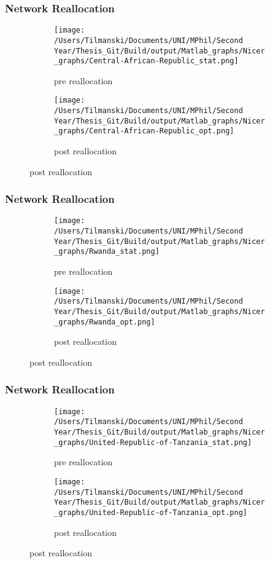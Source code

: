 \documentclass[]{beamer}   	%
\begin{document}
\begin{frame}
  \frametitle{Network Reallocation}
\begin{figure}
\begin{subfigure}[c]{0.48\textwidth}
\texttt{[image: /Users/Tilmanski/Documents/UNI/MPhil/Second Year/Thesis\_Git/Build/output/Matlab\_graphs/Nicer\_graphs/Central-African-Republic\_stat.png]}
\caption{pre reallocation}
\label{fig:cae_pre}
\end{subfigure}
\begin{subfigure}[c]{0.48\textwidth}
\texttt{[image: /Users/Tilmanski/Documents/UNI/MPhil/Second Year/Thesis\_Git/Build/output/Matlab\_graphs/Nicer\_graphs/Central-African-Republic\_opt.png]}
\caption{post reallocation}
\label{fig:cae_post}
\end{subfigure}
\end{figure}
\end{frame}

\begin{frame}
  \frametitle{Network Reallocation}
\begin{figure}
\begin{subfigure}[c]{0.48\textwidth}
\texttt{[image: /Users/Tilmanski/Documents/UNI/MPhil/Second Year/Thesis\_Git/Build/output/Matlab\_graphs/Nicer\_graphs/Rwanda\_stat.png]}
\caption{pre reallocation}
\label{fig:cae_pre}
\end{subfigure}
\begin{subfigure}[c]{0.48\textwidth}
\texttt{[image: /Users/Tilmanski/Documents/UNI/MPhil/Second Year/Thesis\_Git/Build/output/Matlab\_graphs/Nicer\_graphs/Rwanda\_opt.png]}
\caption{post reallocation}
\label{fig:cae_post}
\end{subfigure}
\end{figure}
\end{frame}

\begin{frame}
  \frametitle{Network Reallocation}

\begin{figure}
\begin{subfigure}[c]{0.48\textwidth}
\texttt{[image: /Users/Tilmanski/Documents/UNI/MPhil/Second Year/Thesis\_Git/Build/output/Matlab\_graphs/Nicer\_graphs/United-Republic-of-Tanzania\_stat.png]}
\caption{pre reallocation}
\label{fig:cae_pre}
\end{subfigure}
\begin{subfigure}[c]{0.48\textwidth}
\texttt{[image: /Users/Tilmanski/Documents/UNI/MPhil/Second Year/Thesis\_Git/Build/output/Matlab\_graphs/Nicer\_graphs/United-Republic-of-Tanzania\_opt.png]}
\caption{post reallocation}
\label{fig:cae_post}
\end{subfigure}
\end{figure}
\end{frame}
\end{document}
